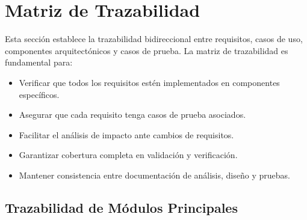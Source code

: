 \documentclass[12pt,a4paper]{article}
\begin{document}
\section{Matriz de Trazabilidad}

Esta sección establece la trazabilidad bidireccional entre requisitos, casos de uso, componentes arquitectónicos y casos de prueba. La matriz de trazabilidad es fundamental para:

\begin{itemize}[noitemsep]
    \item Verificar que todos los requisitos estén implementados en componentes específicos.
    \item Asegurar que cada requisito tenga casos de prueba asociados.
    \item Facilitar el análisis de impacto ante cambios de requisitos.
    \item Garantizar cobertura completa en validación y verificación.
    \item Mantener consistencia entre documentación de análisis, diseño y pruebas.
\end{itemize}

\subsection{Trazabilidad de Módulos Principales}
\end{document}
